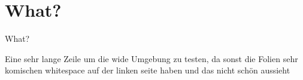 \section{What?}
\begin{frame}{What?}
\begin{wide}
    Eine sehr lange Zeile um die wide Umgebung zu testen, da sonst die Folien sehr komischen whitespace auf der linken seite haben und das nicht schön aussieht
\end{wide}
\end{frame}
